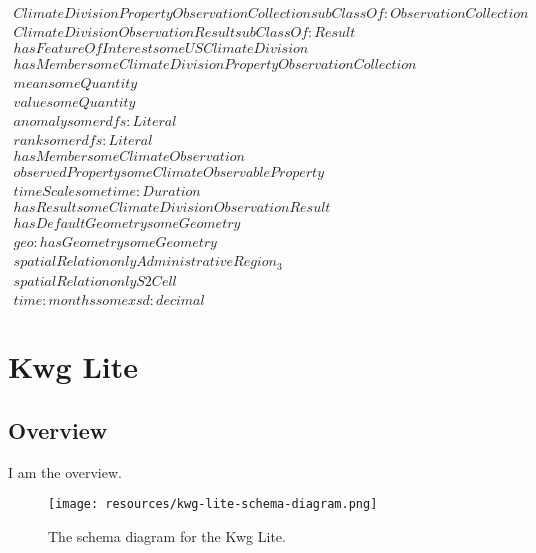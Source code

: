\begin{align}
  ClimateDivisionPropertyObservationCollection subClassOf: ObservationCollection\\
  ClimateDivisionObservationResult subClassOf: Result\\
  hasFeatureOfInterest some USClimateDivision \\
  hasMember some ClimateDivisionPropertyObservationCollection \\
  mean some Quantity \\
  value some Quantity \\
  anomaly some rdfs:Literal \\
  rank some rdfs:Literal \\
  hasMember some ClimateObservation \\
  observedProperty some ClimateObservableProperty \\
  timeScale some time:Duration \\
  hasResult some ClimateDivisionObservationResult \\
  hasDefaultGeometry some Geometry \\
  geo:hasGeometry some Geometry \\
  spatialRelation only AdministrativeRegion_3 \\
  spatialRelation only S2Cell \\
  time:months some xsd:decimal \end{align}



\section{Kwg Lite}
\label{sec:kwg-lite}
\subsection{Overview}
\label{ssec:overview}

I am the overview.

\begin{figure}[h!]
  \begin{center}
    \texttt{[image: resources/kwg-lite-schema-diagram.png]}
  \end{center}
  \caption{The schema diagram for the Kwg Lite.}
  \label{fig:ov-diagram}
\end{figure}



